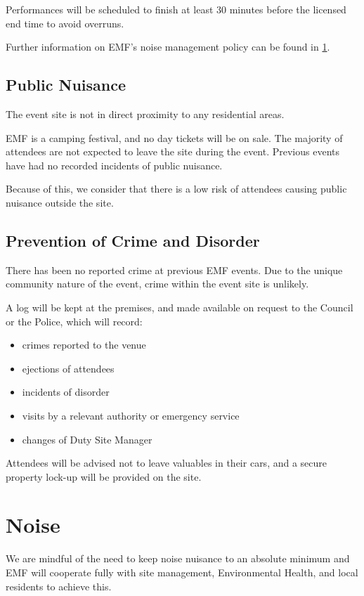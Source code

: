 Performances will be scheduled to finish at least 30 minutes before the
licensed end time to avoid overruns.

Further information on EMF's noise management policy can be found in
\cref{noise}.

\subsection{Public Nuisance}

The event site is not in direct proximity to any residential areas.

EMF is a camping festival, and no day tickets will be on sale. The majority of
attendees are not expected to leave the site during the event. Previous events
have had no recorded incidents of public nuisance.

Because of this, we consider that there is a low risk of attendees causing
public nuisance outside the site.

\subsection{Prevention of Crime and Disorder}

There has been no reported crime at previous EMF events. Due to the unique
community nature of the event, crime within the event site is unlikely.

A log will be kept at the premises, and made available on request to the Council
or the Police, which will record:

\begin{itemize}
\tightlist
    \item crimes reported to the venue
    \item ejections of attendees
    \item incidents of disorder
    \item visits by a relevant authority or emergency service
    \item changes of Duty Site Manager
\end{itemize}

Attendees will be advised not to leave valuables in their cars, and a secure property
lock-up will be provided on the site.

\newpage

\section{Noise}
\label{noise}
We are mindful of the need to keep noise nuisance to an absolute minimum and
EMF will cooperate fully with site management, Environmental Health, and local
residents to achieve this.

